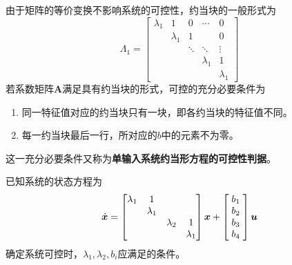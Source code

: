 由于矩阵的等价变换不影响系统的可控性，约当块的一般形式为
\begin{equation}
	\bm{\varLambda}_1 =
	\begin{bmatrix}
		\lambda_1 & 1 & 0 & \cdots & 0 \\
		& \lambda_1 & 1 & & 0\\
		& & \ddots & \ddots &\vdots \\
		& & & \lambda_1 & 1\\
		& & & & \lambda_1
	\end{bmatrix}
\end{equation}
若系数矩阵$\bm{A}$满足具有约当块的形式，可控的充分必要条件为
\begin{enumerate}[\hspace*{2em} (1)]
	\item 同一特征值对应的约当块只有一块，即各约当块的特征值不同。
	\item 每一约当块最后一行，所对应的$b$中的元素不为零。
\end{enumerate}
这一充分必要条件又称为\textbf{单输入系统约当形方程的可控性判据}。

\examples 已知系统的状态方程为
\begin{equation*}
	\dot{\bm{x}} =
	\begin{bmatrix}
		\lambda_1 & 1 & &\\
		& \lambda_1 & & \\
		& & \lambda_2 & 1 \\
		& &  & \lambda_1 
	\end{bmatrix}
	\bm{x} +
	\begin{bmatrix}
	\hspace*{1mm}	b_1 \hspace*{1mm}\\
		b_2\\
		b_3\\
		b_4
	\end{bmatrix}
	\bm{u}
\end{equation*}
确定系统可控时，$\lambda_1, \lambda_2, b_i$应满足的条件。

